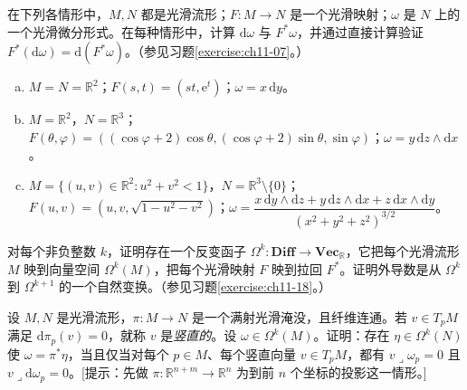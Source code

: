 \documentclass[../../main.tex]{subfiles}
\begin{document}
\begin{exercise}\label{exercise:ch14-07}
在下列各情形中，$M,N$ 都是光滑流形；$F:M\to N$ 是一个光滑映射；$\omega$ 是 $N$ 上的一个光滑微分形式。在每种情形中，计算 $\mathrm{d}\omega$ 与 $F^*\omega$，并通过直接计算验证 $F^*(\mathrm{d}\omega)=\mathrm{d}(F^*\omega)$。（参见习题\ref{exercise:ch11-07}。）
\begin{enumerate}[(a)]
\item $M=N=\mathbb{R}^2$；$F(s,t)=(st,\mathrm{e}^t)$；$\omega=x\,\mathrm{d}y$。
\item $M=\mathbb{R}^2$，$N=\mathbb{R}^3$；$F(\theta,\varphi)=((\cos\varphi+2)\cos\theta,(\cos\varphi+2)\sin\theta,\sin\varphi)$；$\omega=y\,\mathrm{d}z\wedge\mathrm{d}x$。
\item $M=\{(u,v)\in\mathbb{R}^2:u^2+v^2<1\}$，$N=\mathbb{R}^3\setminus\{0\}$；$F(u,v)=\left(u,v,\sqrt{1-u^2-v^2}\right)$；$\omega=\dfrac{x\,\mathrm{d}y\wedge\mathrm{d}z+y\,\mathrm{d}z\wedge\mathrm{d}x+z\,\mathrm{d}x\wedge\mathrm{d}y}{(x^2+y^2+z^2)^{3/2}}$。
\end{enumerate}
\end{exercise}

\begin{exercise}\label{exercise:ch14-08}
对每个非负整数 $k$，证明存在一个反变函子 $\Omega^k:\mathbf{Diff}\to\mathbf{Vec}_{\mathbb R}$，它把每个光滑流形 $M$ 映到向量空间 $\Omega^k(M)$，把每个光滑映射 $F$ 映到拉回 $F^*$。证明外导数是从 $\Omega^k$ 到 $\Omega^{k+1}$ 的一个自然变换。（参见习题\ref{exercise:ch11-18}。）
\end{exercise}

\begin{exercise}\label{exercise:ch14-09}
设 $M,N$ 是光滑流形，$\pi:M\to N$ 是一个满射光滑淹没，且纤维连通。若 $v\in T_pM$ 满足 $\mathrm{d}\pi_p(v)=0$，就称 $v$ 是\emph{竖直的}。设 $\omega\in\Omega^k(M)$。证明：存在 $\eta\in\Omega^k(N)$ 使 $\omega=\pi^*\eta$，当且仅当对每个 $p\in M$、每个竖直向量 $v\in T_pM$，都有 $v\lrcorner\omega_p=0$ 且 $v\lrcorner\mathrm{d}\omega_p=0$。[提示：先做 $\pi:\mathbb{R}^{n+m}\to\mathbb{R}^n$ 为到前 $n$ 个坐标的投影这一情形。]
\end{exercise}
\end{document}
